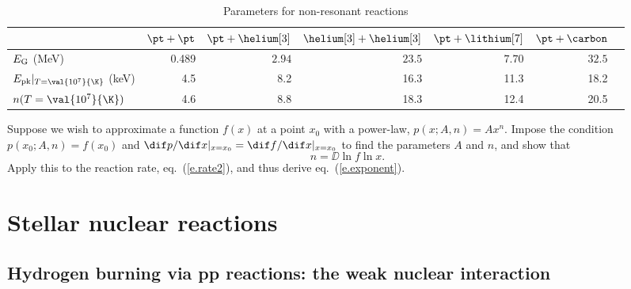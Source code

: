 \begin{table}[hb]
\caption{\label{t.reaction} Parameters for non-resonant reactions}
\begin{tabular}{lrrrrrr}
 & $\pt+\pt$ & $\pt+\helium[3]$ & $\helium[3]+\helium[3]$ & $\pt+\lithium[7]$ & $\pt+\carbon$\\
\hline
$E_{\mathrm{G}}$ (MeV) & 0.489 & $2.94$ & $23.5$ & $7.70$ & $32.5$\\
$\Epk|_{T=\val{10^{7}}{\K}}$ (keV) & 4.5 & 8.2 & 16.3 & 11.3 & 18.2\\
$n(T = \val{10^{7}}{\K})$ & 4.6 & 8.8 & 18.3 & 12.4 & 20.5
\end{tabular}
\end{table}

\begin{exercisebox}
\label{ex.power-law}
Suppose we wish to approximate a function $f(x)$ at a point $x_{0}$ with a power-law, $p(x;A,n) = Ax^{n}$. Impose the condition $p(x_{0};A,n) = f(x_{0})$ and $\dif p/\dif x |_{x=x_{0}} = \dif f/\dif x|_{x=x_{0}}$ to find the parameters $A$ and $n$, and show that
\[
	n = \DD{\ln f}{\ln x}.
\]
Apply this to the reaction rate, eq.~(\ref{e.rate2}), and thus derive eq.~(\ref{e.exponent}).
\end{exercisebox}

\section{Stellar nuclear reactions}

\subsection{Hydrogen burning via pp reactions: the weak nuclear interaction}

